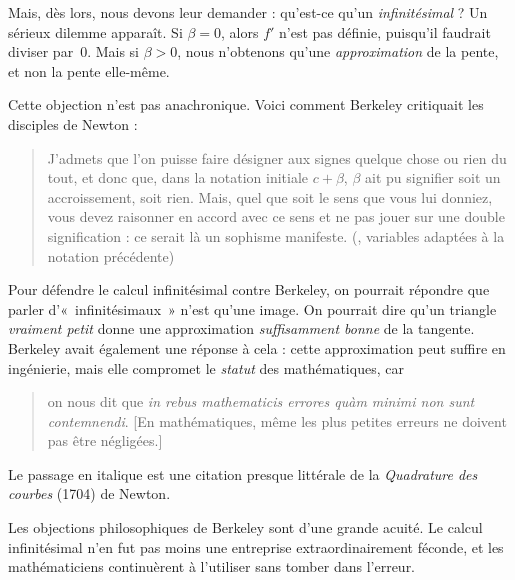 \documentclass[../../../include/open-logic-section]{subfiles}
\begin{document}
Mais, dès lors, nous devons leur demander : qu'est-ce qu'un
\emph{infinitésimal} ? Un sérieux dilemme apparaît. Si $\beta = 0$,
alors $f'$ n'est pas définie, puisqu'il faudrait diviser par~$0$.
Mais si $\beta > 0$, nous n'obtenons qu'une
\emph{approximation} de la pente, et non la pente elle-même.

Cette objection n'est pas anachronique. Voici comment Berkeley
critiquait les disciples de Newton :
\begin{quote}
J'admets que l'on puisse faire désigner aux signes quelque chose ou
rien du tout, et donc que, dans la notation initiale $c + \beta$,
$\beta$ ait pu signifier soit un accroissement, soit rien. Mais,
quel que soit le sens que vous lui donniez, vous devez raisonner
en accord avec ce sens et ne pas jouer sur une double signification :
ce serait là un sophisme manifeste.
(\citealt[\S{}XIII]{Berkeley1734}, variables adaptées à la notation
précédente)
\end{quote}
Pour défendre le calcul infinitésimal contre Berkeley, on pourrait
répondre que parler d'«~infinitésimaux~» n'est qu'une image. On
pourrait dire qu'un triangle \emph{vraiment petit} donne une
approximation \emph{suffisamment bonne} de la tangente. Berkeley
avait également une réponse à cela : cette approximation peut
suffire en ingénierie, mais elle compromet le \emph{statut} des
mathématiques, car
\begin{quote}
on nous dit que \emph{in rebus mathematicis errores qu\`{a}m minimi
non sunt contemnendi}. [En mathématiques, même les plus petites
erreurs ne doivent pas être négligées.] \citep[\S{}IX]{Berkeley1734}
\end{quote}
Le passage en italique est une citation presque littérale de la
\emph{Quadrature des courbes} (1704) de Newton.

Les objections philosophiques de Berkeley sont d'une grande acuité.
Le calcul infinitésimal n'en fut pas moins une entreprise
extraordinairement féconde, et les mathématiciens continuèrent à
l'utiliser sans tomber dans l'erreur.
\end{document}
